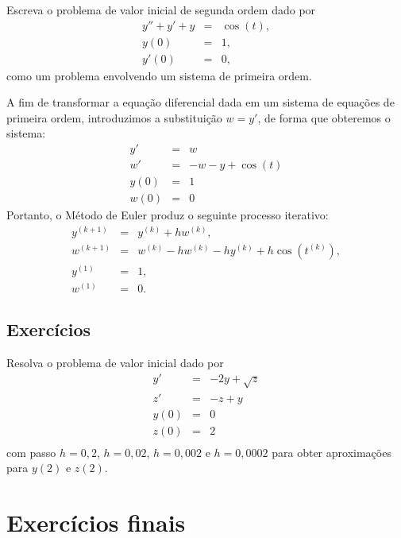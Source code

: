 \begin{ex} Escreva o problema de valor inicial de segunda ordem dado por
\begin{eqnarray*}
y''+y'+y&=&\cos(t),\\
y(0)&=&1,\\
y'(0)&=&0,
\end{eqnarray*}
como um problema envolvendo um sistema de primeira ordem.
\end{ex}
A fim de transformar a equação diferencial dada em um sistema de equações de primeira ordem, introduzimos a substituição $w=y'$, de forma que obteremos o sistema:
\begin{eqnarray*}
y'&=&w\\
w'&=&-w-y+\cos(t)\\
y(0)&=&1\\
w(0)&=&0
\end{eqnarray*}
Portanto, o Método de Euler produz o seguinte processo iterativo:
\begin{eqnarray*}
y^{(k+1)}&=&y^{(k)}+hw^{(k)},\\
w^{(k+1)}&=&w^{(k)}-hw^{(k)}-hy^{(k)}+h\cos(t^{(k)}),\\
y^{(1)}&=&1,\\
w^{(1)}&=&0.
\end{eqnarray*}


\subsection*{Exercícios}

\begin{exer}Resolva o problema de valor inicial dado por
\begin{eqnarray*}
y'&=& -2y + \sqrt{z}\\
z'&=& -z + y\\
y(0)&=&0\\
z(0)&=&2\\
\end{eqnarray*}
com passo $h=0,2$, $h=0,02$, $h=0,002$ e $h=0,0002$ para obter aproximações para $y(2)$ e $z(2)$.
\end{exer}


\section{Exercícios finais}

